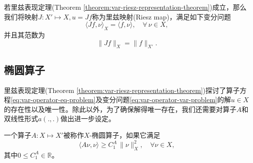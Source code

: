 \begin{definition}[里兹映射]
  \label{definition:var-riesz-map-def}
  若里兹表现定理(Theorem \ref{theorem:var-riesz-representation-theorem})成立，那么我们将映射$J:X' \mapsto X, u = J f$称为里兹映射(Riesz map)，满足如下变分问题
  \begin{equation}
    \label{eq:var-riesz-map-def}
    \langle Jf, \nu \rangle_{X} = \langle f, \nu \rangle, \quad \forall \, \nu \in X,
  \end{equation}
  并且其范数为
  \begin{equation}
    \label{eq:var-riesz-map-norm}
    \big\| J f \big\|_{X} = \big\| f \big\|_{X'}.
  \end{equation}
\end{definition}

\subsection{椭圆算子}
\label{sec:var-elliptic-operators}
里兹表现定理(Theorem \ref{theorem:var-riesz-representation-theorem})探讨了算子方程\eqref{eq:var-operator-eq-problem}及变分问题\eqref{eq:var-operator-var-problem}的解$u \in X$的存在性以及唯一性。除此以外，为了确保解得唯一存在，我们还需要对算子$A$和双线性形式$a(.,.)$做出进一步设定。

\begin{definition}[椭圆算子]
  \label{definition:var-elliptic-operator-def}
一个算子$A:X \mapsto X'$被称作$X$-椭圆算子，如果它满足
\begin{equation}
  \label{eq:var-elliptic-operator-def}
  \langle A \nu, \nu \rangle \ge C_1^A \, \big\|\nu\big\|_{X}^2, \quad \forall \nu \in X,
\end{equation}
其中$0 \le C_1^A \in \mathbb{R}$。
\end{definition}

